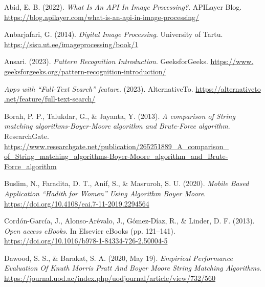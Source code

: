 {}

\begin{thebibliography}{20}

    Abid, E. B. (2022). \emph{What Is An API In Image Processing?}. APILayer Blog.
    \href{https://blog.apilayer.com/what-is-an-api-in-image-processing/}{https://blog.apilayer.com/what-is-an-api-in-image-processing/}

    Anbarjafari, G. (2014). \emph{Digital Image Processing}. University of Tartu.
    \href{https://sisu.ut.ee/imageprocessing/book/1}{https://sisu.ut.ee/imageprocessing/book/1}

    Ansari. (2023). \emph{Pattern Recognition \textbar{} Introduction}. GeeksforGeeks.
    \href{https://www.geeksforgeeks.org/pattern-recognition-introduction/}{https://www.\\geeksforgeeks.org/pattern-recognition-introduction/}

    \emph{Apps with “Full-Text Search” feature}. (2023). AlternativeTo.
    \href{https://alternativeto.net/feature/full-text-search/}{https://alternativeto\\.net/feature/full-text-search/}

    Borah, P. P., Talukdar, G., \& Jayanta, Y. (2013). \emph{A comparison of String matching
    algorithms-Boyer-Moore algorithm and Brute-Force algorithm}. ResearchGate.
    \href{https://www.researchgate.net/publication/265251889_A_comparison_of_String_matching_algorithms-Boyer-Moore_algorithm_and_Brute-Force_algorithm}{https://www.researchgate.net/publication/265251889\_A\_comparison\_\\of\_String\_matching\_algorithms-Boyer-Moore\_algorithm\_and\_Brute-Force\_algorithm}

    Buslim, N., Faradita, D. T., Anif, S., \& Masruroh, S. U. (2020). \emph{Mobile Based Application
    “Hadith for Women” Using Algorithm Boyer Moore}.
    \href{https://doi.org/10.4108/eai.7-11-2019.2294564}{https://doi.org/10.4108/eai.7-11-2019.2294564}

    Cordón-García, J., Alonso-Arévalo, J., Gómez-Díaz, R., \& Linder, D. F. (2013). \emph{Open access
    eBooks}. In Elsevier eBooks (pp. 121–141).
    \href{https://doi.org/10.1016/b978-1-84334-726-2.50004-5}{https://doi.org/10.1016/b978-1-84334-726-2.50004-5}

    Dawood, S. S., \& Barakat, S. A. (2020, May 19). \emph{Empirical Performance Evaluation Of Knuth
    Morris Pratt And Boyer Moore String Matching Algorithms}.
    \href{https://journal.uod.ac/index.php/uodjournal/article/view/732/560}{https://journal.uod.ac/index.php/uodjournal/article/view/732/560}


\end{thebibliography}
